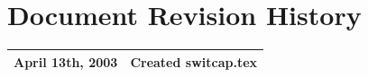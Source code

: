 \documentclass{article}
\begin{document}
\newpage
\section{Document Revision History}

\begin{table}[h]
\begin{tabular}{|l|l|} \hline
April 13th, 2003 & Created switcap.tex \\ \hline
\end{tabular}
\end{table}
\end{document}
